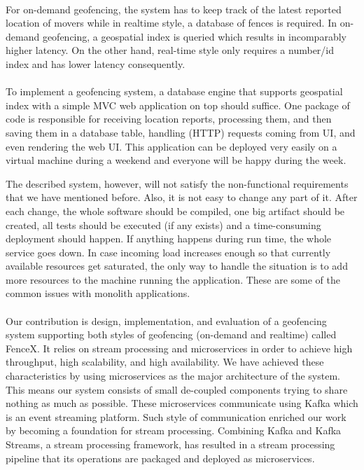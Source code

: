\documentclass[a4]{report}
\begin{document}
    \paragraph{}
    For on-demand geofencing, the system has to keep track of the latest reported location of movers while in realtime
    style, a database of fences is required.
    In on-demand geofencing, a geospatial index is queried which results in incomparably higher latency.
    On the other hand, real-time style only requires a number/id index and has lower latency consequently.

    \paragraph{}
    To implement a geofencing system, a database engine that supports geospatial index with a simple MVC\cite{mvc}
    web application on top should suffice.
    One package of code is responsible for receiving location reports, processing them, and then saving them in
    a database table, handling (HTTP) requests coming from UI, and even rendering the web UI.
    This application can be deployed very easily on a virtual machine during a weekend and everyone will be happy
    during the week.

    The described system, however, will not satisfy the non-functional requirements that we have mentioned before.
    Also, it is not easy to change any part of it.
    After each change, the whole software should be compiled, one big artifact should be created, all tests should be executed (if any exists) and a time-consuming deployment should happen.
    If anything happens during run time, the whole service goes down.
    In case incoming load increases enough so that currently available resources get saturated, the only way to handle the situation is to add more resources to the machine running the application.
    These are some of the common issues with monolith\cite{monolith} applications.

    \paragraph{}
    Our contribution is design, implementation, and evaluation of a geofencing system supporting both styles of
    geofencing (on-demand and realtime) called FenceX\cite{fencex}.
    It relies on stream processing\cite{making-sense-of-stream-processing} and microservices\cite{microservices} in
    order to achieve high throughput, high scalability, and high availability.
    We have achieved these characteristics by using microservices as the major architecture of the system.
    This means our system consists of small de-coupled components trying to share nothing as much as possible.
    These microservices communicate using Kafka\cite{kafka} which is an event streaming\cite{design-event-driven-systems} platform.
    Such style of communication enriched our work by becoming a foundation for stream processing.
    Combining Kafka and Kafka Streams\cite{KafkaStreams}, a stream processing framework, has resulted in a
    stream processing pipeline that its operations are packaged and deployed as microservices.
\end{document}
